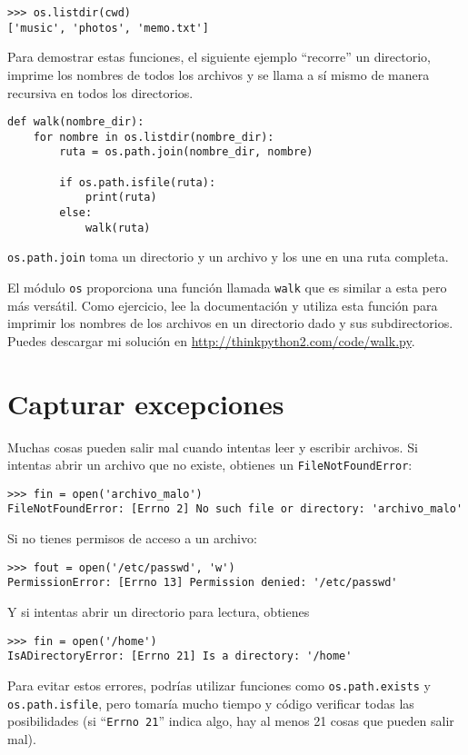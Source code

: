 \documentclass[10pt]{book}
\begin{document}
\begin{verbatim}
>>> os.listdir(cwd)
['music', 'photos', 'memo.txt']
\end{verbatim}
%
Para demostrar estas funciones, el siguiente ejemplo
``recorre'' un directorio, imprime
los nombres de todos los archivos y se llama a sí mismo de manera recursiva en
todos los directorios.

\begin{verbatim}
def walk(nombre_dir):
    for nombre in os.listdir(nombre_dir):
        ruta = os.path.join(nombre_dir, nombre)

        if os.path.isfile(ruta):
            print(ruta)
        else:
            walk(ruta)
\end{verbatim}
%
{\tt os.path.join} toma un directorio y un archivo y los une
en una ruta completa.

El módulo {\tt os} proporciona una función llamada {\tt walk} que es
similar a esta pero más versátil.  Como ejercicio, lee la
documentación y utiliza esta función para imprimir los nombres de los archivos
en un directorio dado y sus subdirectorios.  Puedes descargar mi solución en
\url{http://thinkpython2.com/code/walk.py}.


\section{Capturar excepciones}
\label{catch}

Muchas cosas pueden salir mal cuando intentas leer y escribir
archivos.  Si intentas abrir un archivo que no existe, obtienes un
{\tt FileNotFoundError}:

\begin{verbatim}
>>> fin = open('archivo_malo')
FileNotFoundError: [Errno 2] No such file or directory: 'archivo_malo'
\end{verbatim}
%
Si no tienes permisos de acceso a un archivo:

\begin{verbatim}
>>> fout = open('/etc/passwd', 'w')
PermissionError: [Errno 13] Permission denied: '/etc/passwd'
\end{verbatim}
%
Y si intentas abrir un directorio para lectura, obtienes

\begin{verbatim}
>>> fin = open('/home')
IsADirectoryError: [Errno 21] Is a directory: '/home'
\end{verbatim}
%
Para evitar estos errores, podrías utilizar funciones como {\tt os.path.exists}
y {\tt os.path.isfile}, pero tomaría mucho tiempo y código
verificar todas las posibilidades (si ``{\tt Errno 21}'' indica
algo, hay al menos 21 cosas que pueden salir mal).
\end{document}
